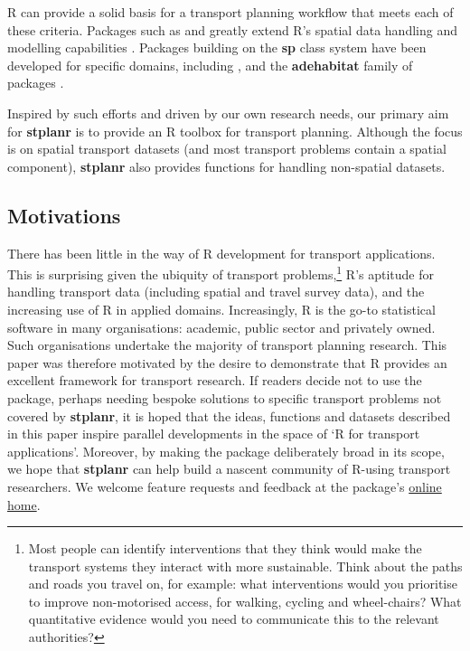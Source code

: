 R can provide a solid basis for a transport planning workflow that meets
each of these criteria. Packages such as 
\citep{pebesma_classes_2005} and 
\citep{bivand_rgeos:_2016} greatly extend R's spatial data handling and
modelling capabilities \citep{bivand_applied_2013}. Packages building on
the \textbf{sp} class system have been developed for specific domains,
including  \citep{kim_spatialepi:_2016},
 \citep{brown_diseasemapping:_2016} and the
\textbf{adehabitat} family of packages \citep{calenge_package_2006}.

Inspired by such efforts and driven by our own research needs, our
primary aim for \textbf{stplanr} is to provide an R toolbox for
transport planning. Although the focus is on spatial transport datasets
(and most transport problems contain a spatial component),
\textbf{stplanr} also provides functions for handling non-spatial
datasets.

\subsection{Motivations}\label{motivations}

There has been little in the way of R development for transport
applications. This is surprising given the ubiquity of transport
problems,\footnote{Most people can identify interventions that they
  think would make the transport systems they interact with more
  sustainable. Think about the paths and roads you travel on, for
  example: what interventions would you prioritise to improve
  non-motorised access, for walking, cycling and wheel-chairs? What
  quantitative evidence would you need to communicate this to the
  relevant authorities?} R's aptitude for handling transport data
(including spatial and travel survey data), and the increasing use of R
in applied domains. Increasingly, R is the go-to statistical software in
many organisations: academic, public sector and privately owned. Such
organisations undertake the majority of transport planning research.
This paper was therefore motivated by the desire to demonstrate that R
provides an excellent framework for transport research. If readers
decide not to use the package, perhaps needing bespoke solutions to
specific transport problems not covered by \textbf{stplanr}, it is hoped
that the ideas, functions and datasets described in this paper inspire
parallel developments in the space of `R for transport applications'.
Moreover, by making the package deliberately broad in its scope, we hope
that \textbf{stplanr} can help build a nascent community of R-using
transport researchers. We welcome feature requests and feedback at the
package's \href{https://github.com/ropensci/stplanr/issues}{online
home}.

